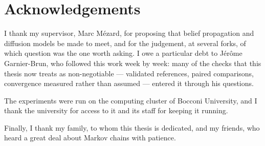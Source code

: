 \chapter*{Acknowledgements}

I thank my supervisor, Marc M\'ezard, for proposing that belief propagation
and diffusion models be made to meet, and for the judgement, at several
forks, of which question was the one worth asking. I owe a particular debt
to J\'er\^ome Garnier-Brun, who followed this work week by week: many of the
checks that this thesis now treats as non-negotiable --- validated
references, paired comparisons, convergence measured rather than assumed ---
entered it through his questions.

The experiments were run on the computing cluster of Bocconi University, and
I thank the university for access to it and its staff for keeping it
running.

Finally, I thank my family, to whom this thesis is dedicated, and my
friends, who heard a great deal about Markov chains with patience.
\clearpage
